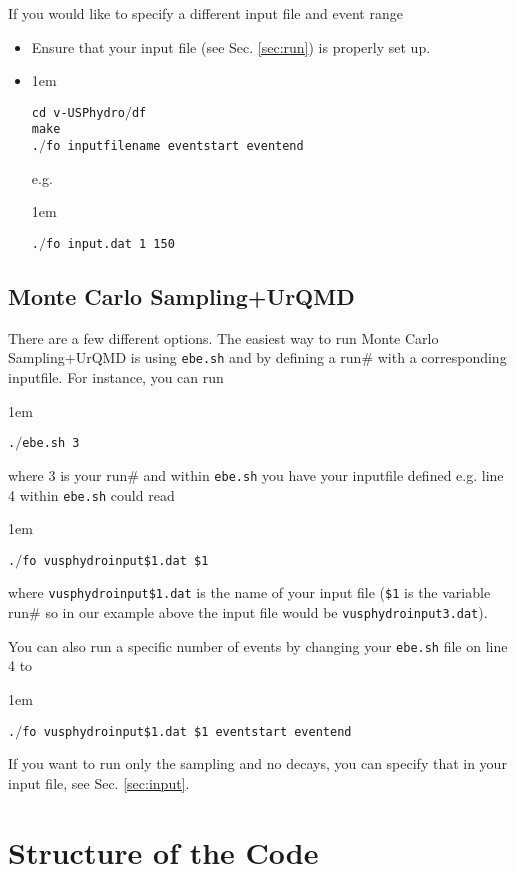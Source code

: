 \documentclass[article]{revtex4-1}
\newcommand{\code}[1]{\bigskip\noindent\begin{addmargin}[3em]{1em}\begin{linenumbers}\texttt{#1}\end{linenumbers}\end{addmargin}\bigskip}
\newcommand{\nocode}[1]{\texttt{#1}}
\begin{document}
If you would like to specify a different input file and event range

\begin{itemize}
\item Ensure that your input file (see Sec. \ref{sec:run}) is properly set up.
\item \code{cd v-USPhydro$/$df\\
make\\
.$/$fo inputfilename event\textunderscore start event\textunderscore end} e.g. \code{.$/$fo input.dat 1 150}
\end{itemize}

\subsection{Monte Carlo Sampling+UrQMD}

There are a few different options.  The easiest way to run Monte Carlo Sampling+UrQMD is using \nocode{ebe.sh} and by defining a run$\#$ with a corresponding inputfile.  For instance, you can run
\code{.$/$ebe.sh 3}
where 3 is your run$\#$ and within \nocode{ebe.sh} you have your inputfile defined e.g. line 4 within  \nocode{ebe.sh} could read
\code{.$/$fo vusphydroinput\$1.dat \$1}
where \nocode{vusphydroinput\$1.dat} is the name of your input file (\nocode{\$1} is the variable run$\#$ so in our example above the input file would be \nocode{vusphydroinput3.dat}).

You can also run a specific number of events by changing your \nocode{ebe.sh} file on line 4 to
\code{.$/$fo vusphydroinput\$1.dat \$1 event\textunderscore start event\textunderscore end}

If you want to run only the sampling and no decays, you can specify that in your input file, see Sec. \ref{sec:input}.

\section{Structure of the Code}\label{sec:struct}
\end{document}
